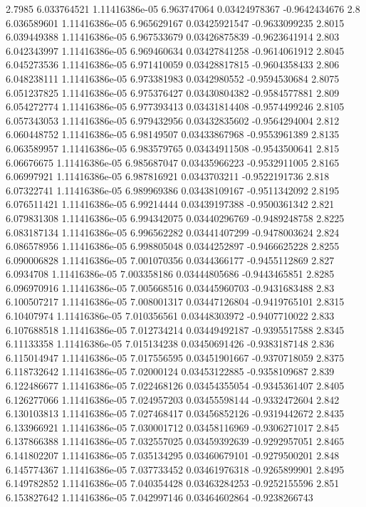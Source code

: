 {2.7985 6.033764521 1.11416386e-05 6.963747064 0.03424978367 -0.9642434676
2.8 6.036589601 1.11416386e-05 6.965629167 0.03425921547 -0.9633099235
2.8015 6.039449388 1.11416386e-05 6.967533679 0.03426875839 -0.9623641914
2.803 6.042343997 1.11416386e-05 6.969460634 0.03427841258 -0.9614061912
2.8045 6.045273536 1.11416386e-05 6.971410059 0.03428817815 -0.9604358433
2.806 6.048238111 1.11416386e-05 6.973381983 0.0342980552 -0.9594530684
2.8075 6.051237825 1.11416386e-05 6.975376427 0.03430804382 -0.9584577881
2.809 6.054272774 1.11416386e-05 6.977393413 0.03431814408 -0.9574499246
2.8105 6.057343053 1.11416386e-05 6.979432956 0.03432835602 -0.9564294004
2.812 6.060448752 1.11416386e-05 6.98149507 0.03433867968 -0.9553961389
2.8135 6.063589957 1.11416386e-05 6.983579765 0.03434911508 -0.9543500641
2.815 6.06676675 1.11416386e-05 6.985687047 0.03435966223 -0.9532911005
2.8165 6.06997921 1.11416386e-05 6.987816921 0.0343703211 -0.9522191736
2.818 6.07322741 1.11416386e-05 6.989969386 0.03438109167 -0.9511342092
2.8195 6.076511421 1.11416386e-05 6.99214444 0.03439197388 -0.9500361342
2.821 6.079831308 1.11416386e-05 6.994342075 0.03440296769 -0.9489248758
2.8225 6.083187134 1.11416386e-05 6.996562282 0.03441407299 -0.9478003624
2.824 6.086578956 1.11416386e-05 6.998805048 0.0344252897 -0.9466625228
2.8255 6.090006828 1.11416386e-05 7.001070356 0.0344366177 -0.9455112869
2.827 6.0934708 1.11416386e-05 7.003358186 0.03444805686 -0.9443465851
2.8285 6.096970916 1.11416386e-05 7.005668516 0.03445960703 -0.9431683488
2.83 6.100507217 1.11416386e-05 7.008001317 0.03447126804 -0.9419765101
2.8315 6.10407974 1.11416386e-05 7.010356561 0.03448303972 -0.9407710022
2.833 6.107688518 1.11416386e-05 7.012734214 0.03449492187 -0.9395517588
2.8345 6.11133358 1.11416386e-05 7.015134238 0.03450691426 -0.9383187148
2.836 6.115014947 1.11416386e-05 7.017556595 0.03451901667 -0.9370718059
2.8375 6.118732642 1.11416386e-05 7.02000124 0.03453122885 -0.9358109687
2.839 6.122486677 1.11416386e-05 7.022468126 0.03454355054 -0.9345361407
2.8405 6.126277066 1.11416386e-05 7.024957203 0.03455598144 -0.9332472604
2.842 6.130103813 1.11416386e-05 7.027468417 0.03456852126 -0.9319442672
2.8435 6.133966921 1.11416386e-05 7.030001712 0.03458116969 -0.9306271017
2.845 6.137866388 1.11416386e-05 7.032557025 0.03459392639 -0.9292957051
2.8465 6.141802207 1.11416386e-05 7.035134295 0.03460679101 -0.9279500201
2.848 6.145774367 1.11416386e-05 7.037733452 0.03461976318 -0.9265899901
2.8495 6.149782852 1.11416386e-05 7.040354428 0.03463284253 -0.9252155596
2.851 6.153827642 1.11416386e-05 7.042997146 0.03464602864 -0.9238266743
}
